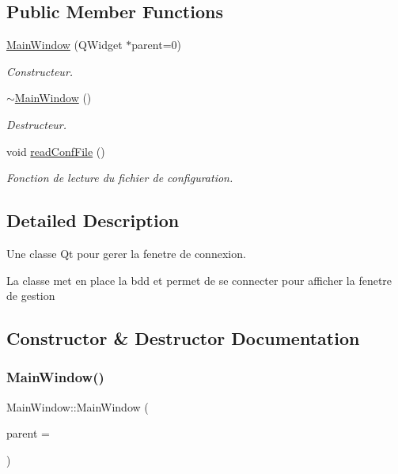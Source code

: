 \subsection*{Public Member Functions}
\begin{DoxyCompactItemize}
\item 
\mbox{\hyperlink{classMainWindow_a8b244be8b7b7db1b08de2a2acb9409db}{Main\+Window}} (Q\+Widget $\ast$parent=0)
\begin{DoxyCompactList}\small\item\em Constructeur. \end{DoxyCompactList}\item 
\mbox{\hyperlink{classMainWindow_ae98d00a93bc118200eeef9f9bba1dba7}{$\sim$\+Main\+Window}} ()
\begin{DoxyCompactList}\small\item\em Destructeur. \end{DoxyCompactList}\item 
void \mbox{\hyperlink{classMainWindow_ad098a8e0f66eebcdda2a7a1ee7fba382}{read\+Conf\+File}} ()
\begin{DoxyCompactList}\small\item\em Fonction de lecture du fichier de configuration. \end{DoxyCompactList}\end{DoxyCompactItemize}


\subsection{Detailed Description}
Une classe Qt pour gerer la fenetre de connexion. 

La classe met en place la bdd et permet de se connecter pour afficher la fenetre de gestion 

\subsection{Constructor \& Destructor Documentation}
\mbox{\label{classMainWindow_a8b244be8b7b7db1b08de2a2acb9409db}} 
\subsubsection{\texorpdfstring{Main\+Window()}{MainWindow()}}
{\footnotesize\ttfamily Main\+Window\+::\+Main\+Window (\begin{DoxyParamCaption}\item[{Q\+Widget $\ast$}]{parent = {} }\end{DoxyParamCaption})\hspace{0.3cm}{\ttfamily [explicit]}}



